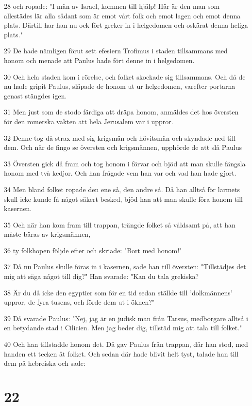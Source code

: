 \par 28 och ropade: "I män av Israel, kommen till hjälp! Här är den man som allestädes lär alla sådant som är emot vårt folk och emot lagen och emot denna plats. Därtill har han nu ock fört greker in i helgedomen och oskärat denna heliga plats."
\par 29 De hade nämligen förut sett efesiern Trofimus i staden tillsammans med honom och menade att Paulus hade fört denne in i helgedomen.
\par 30 Och hela staden kom i rörelse, och folket skockade sig tillsammans. Och då de nu hade gripit Paulus, släpade de honom ut ur helgedomen, varefter portarna genast stängdes igen.
\par 31 Men just som de stodo färdiga att dräpa honom, anmäldes det hos översten för den romerska vakten att hela Jerusalem var i uppror.
\par 32 Denne tog då strax med sig krigsmän och hövitsmän och skyndade ned till dem. Och när de fingo se översten och krigsmännen, upphörde de att slå Paulus
\par 33 Översten gick då fram och tog honom i förvar och bjöd att man skulle fängsla honom med två kedjor. Och han frågade vem han var och vad han hade gjort.
\par 34 Men bland folket ropade den ene så, den andre så. Då han alltså för larmets skull icke kunde få något säkert besked, bjöd han att man skulle föra honom till kasernen.
\par 35 Och när han kom fram till trappan, trängde folket så våldsamt på, att han måste bäras av krigsmännen,
\par 36 ty folkhopen följde efter och skriade: "Bort med honom!"
\par 37 Då nu Paulus skulle föras in i kasernen, sade han till översten: "Tillstädjes det mig att säga något till dig?" Han svarade: "Kan du tala grekiska?
\par 38 Är du då icke den egyptier som för en tid sedan ställde till 'dolkmännens' uppror, de fyra tusens, och förde dem ut i öknen?"
\par 39 Då svarade Paulus: "Nej, jag är en judisk man från Tarsus, medborgare alltså i en betydande stad i Cilicien. Men jag beder dig, tillstäd mig att tala till folket."
\par 40 Och han tillstadde honom det. Då gav Paulus från trappan, där han stod, med handen ett tecken åt folket. Och sedan där hade blivit helt tyst, talade han till dem på hebreiska och sade:

\chapter{22}

